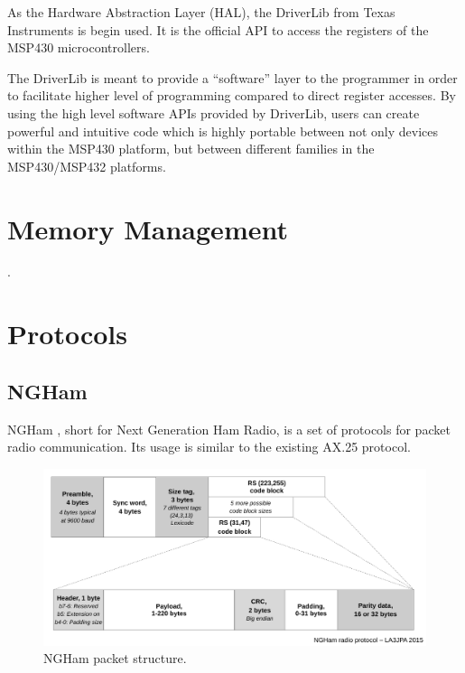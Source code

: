 As the Hardware Abstraction Layer (HAL), the DriverLib \cite{driverlib} from Texas Instruments is begin used. It is the official API to access the registers of the MSP430 microcontrollers.

The DriverLib is meant to provide a ``software'' layer to the programmer in order to facilitate higher level of programming compared to direct register accesses. By using the high level software APIs provided by DriverLib, users can create powerful and intuitive code which is highly portable between not only devices within the MSP430 platform, but between different families in the MSP430/MSP432 platforms.

\section{Memory Management}

.

\section{Protocols}

\subsection{NGHam}

NGHam \cite{ngham}, short for Next Generation Ham Radio, is a set of protocols for packet radio communication. Its usage is similar to the existing AX.25 protocol.

\begin{figure}[!ht]
    \begin{center}
        \includegraphics[width=\textwidth]{figures/ngham_block_v4.pdf}
        \caption{NGHam packet structure.}
        \label{fig:ngham-stack}
    \end{center}
\end{figure}

